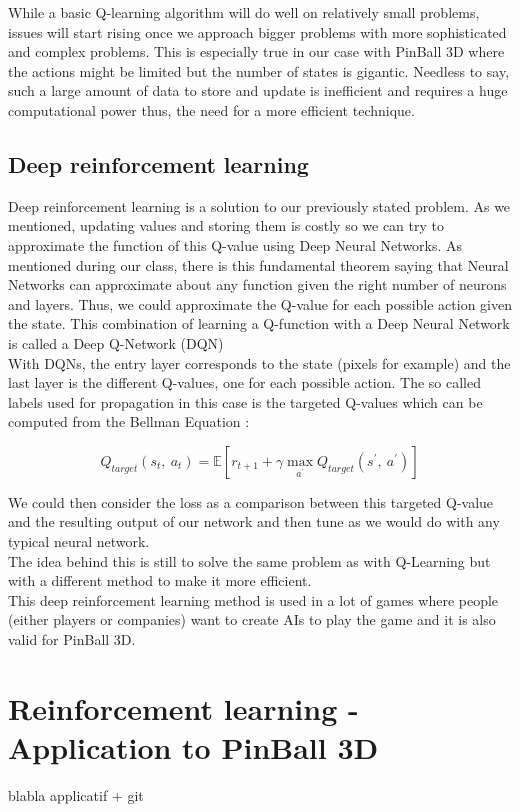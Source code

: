 \documentclass[a4paper,12pt,calibri,oneside,openany]{book}
\theoremstyle{break}
\begin{document}
While a basic Q-learning algorithm will do well on relatively small problems, issues will start rising once we approach bigger problems with more sophisticated and complex problems. This is especially true in our case with PinBall 3D where the actions might be limited but the number of states is gigantic. Needless to say, such a large amount of data to store and update is inefficient and requires a huge computational power thus, the need for a more efficient technique.
\section{Deep reinforcement learning}
\qquad Deep reinforcement learning is a solution to our previously stated problem. As we mentioned, updating values and storing them is costly so we can try to approximate the function of this Q-value using Deep Neural Networks. As mentioned during our class, there is this fundamental theorem saying that Neural Networks can approximate about any function given the right number of neurons and layers. Thus, we could approximate the Q-value for each possible action given the state. This combination of learning a Q-function with a Deep Neural Network is called a Deep Q-Network (DQN)\\
\clearpage
With DQNs, the entry layer corresponds to the state (pixels for example) and the last layer is the different Q-values, one for each possible action. The so called labels used for propagation in this case is the targeted Q-values which can be computed from the Bellman Equation :

$$
Q_{target} (s_t,\ a_t)=\mathbb{E}\left[ r_{t+1}+\gamma \max_{a^{'}} Q_{target}(s^{'},\ a^{'}) \right] 
$$

We could then consider the loss as a comparison between this targeted Q-value and the resulting output of our network and then tune as we would do with any typical neural network.\\

The idea behind this is still to solve the same problem as with Q-Learning but with a different method to make it more efficient.\\

This deep reinforcement learning method is used in a lot of games where people (either players or companies) want to create AIs to play the game and it is also valid for PinBall 3D.

\chapter{Reinforcement learning - Application to PinBall 3D}
blabla applicatif + git
\end{document}
